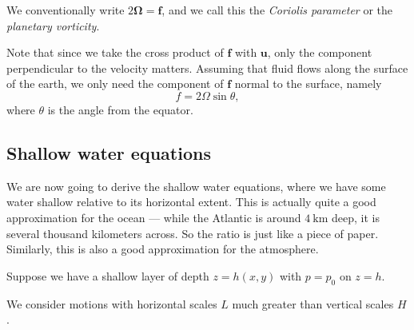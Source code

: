 \documentclass[a4paper]{article}
\begin{document}
\begin{defi}
  We conventionally write $2 \boldsymbol\Omega = \mathbf{f}$, and we call this the \emph{Coriolis parameter} or the \emph{planetary vorticity}.
\end{defi}

Note that since we take the cross product of $\mathbf{f}$ with $\mathbf{u}$, only the component perpendicular to the velocity matters. Assuming that fluid flows along the surface of the earth, we only need the component of $\mathbf{f}$ normal to the surface, namely
\[
  f = 2 \Omega \sin \theta,
\]
where $\theta$ is the angle from the equator.
\subsection{Shallow water equations}
We are now going to derive the shallow water equations, where we have some water shallow relative to its horizontal extent. This is actually quite a good approximation for the ocean --- while the Atlantic is around $\SI{4}{\kilo\meter}$ deep, it is several thousand kilometers across. So the ratio is just like a piece of paper. Similarly, this is also a good approximation for the atmosphere.

Suppose we have a shallow layer of depth $z = h(x, y)$ with $p = p_0$ on $z = h$.
\begin{center}
\end{center}
We consider motions with horizontal scales $L$ much greater than vertical scales $H$.
\end{document}
